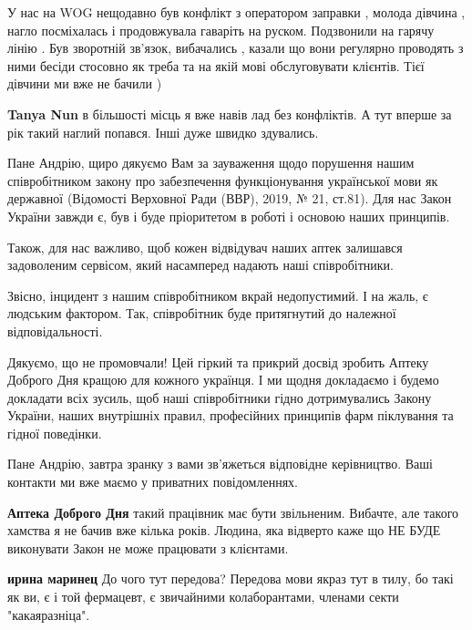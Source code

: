\begin{itemize}

У нас на WOG нещодавно був конфлікт з оператором заправки , молода дівчина ,
нагло посміхалась і продовжувала гаваріть на руском. Подзвонили на гарячу лінію
. Був зворотній зв'язок, вибачались , казали що вони регулярно проводять з ними
бесіди стосовно як треба та на якій мові обслуговувати клієнтів. Тієї дівчини
ми вже не бачили )

\begin{itemize} %
\textbf{Tanya Nun} в більшості місць я вже навів лад без конфліктів.
А тут вперше за рік такий наглий попався. Інші дуже швидко здувались.
\end{itemize} %


Пане Андрію, щиро дякуємо Вам за зауваження щодо порушення нашим співробітником
закону про забезпечення функціонування української мови як державної (Відомості
Верховної Ради (ВВР), 2019, № 21, ст.81). Для нас Закон України завжди є, був і
буде пріоритетом в роботі і основою наших принципів.

Також, для нас важливо, щоб кожен відвідувач наших аптек залишався задоволеним
сервісом, який насамперед надають наші співробітники.

Звісно, інцидент з нашим співробітником вкрай недопустимий. І на жаль, є
людським фактором. Так, співробітник буде притягнутий до належної
відповідальності.

Дякуємо, що не промовчали! Цей гіркий та прикрий досвід зробить Аптеку Доброго
Дня кращою для кожного українця. І ми щодня докладаємо і будемо докладати всіх
зусиль, щоб наші співробітники гідно дотримувались Закону України, наших
внутрішніх правил, професійних принципів фарм піклування та гідної поведінки.

\begin{itemize} %
Пане Андрію, завтра зранку з вами зв’яжеться відповідне керівництво. Ваші контакти ми вже маємо у приватних повідомленнях.


\textbf{Аптека Доброго Дня} такий працівник має бути звільненим.
Вибачте, але такого хамства я не бачив вже кілька років.
Людина, яка відверто каже що НЕ БУДЕ виконувати Закон не може працювати з клієнтами.

\textbf{ирина маринец} До чого тут передова? Передова мови якраз тут в тилу, бо такі як ви, є і той фермацевт, є звичайними колаборантами, членами секти "какаяразніца".


\end{itemize}
\end{itemize}
